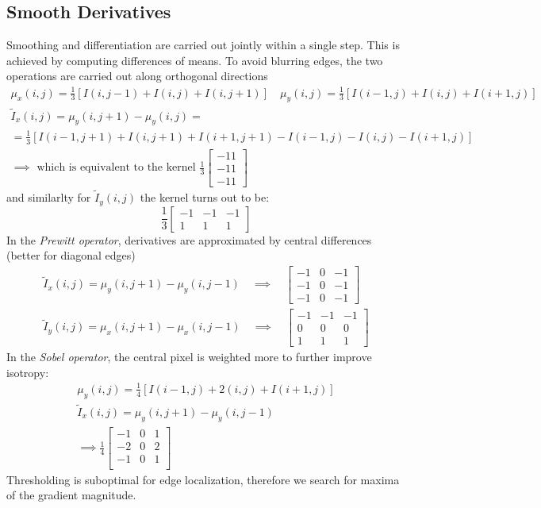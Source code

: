 \documentclass{article}
\begin{document}
\subsection{Smooth Derivatives}
Smoothing and differentiation are carried out jointly within a single step. This is achieved  by computing differences of means. To avoid blurring edges, the two operations are carried out along orthogonal directions
\begin{gather*}
    \mu_x(i,j)=\displaystyle\frac{1}{3}[I(i,j-1)+I(i,j)+I(i,j+1)] \quad \mu_y(i,j)=\displaystyle\frac{1}{3}[I(i-1,j)+I(i,j)+I(i+1,j)]\\
    \tilde{I}_x(i,j) = \mu_y(i,j+1)-\mu_y(i,j) =\\= \displaystyle\frac{1}{3}[I(i-1,j+1)+I(i,j+1)+I(i+1,j+1)-I(i-1,j)-I(i,j)-I(i+1,j)]\\
    \implies \text{ which is equivalent to the kernel }\displaystyle\frac{1}{3}\begin{bmatrix}
        -1 1 \\
        -1 1 \\
        -1 1 
    \end{bmatrix}
\end{gather*}
and similarlty for $\tilde{I}_y(i,j)$ the kernel turns out to be:
\[
    \displaystyle\frac{1}{3}\begin{bmatrix}
        -1 & -1 & -1 \\
        1 & 1 & 1
    \end{bmatrix}
\]
In the \emph{Prewitt operator}, derivatives are approximated by central differences (better for diagonal edges)
\begin{gather*}
    \tilde{I}_x(i,j)=\mu_y(i,j+1)-\mu_y(i,j-1) \quad \implies \quad \begin{bmatrix}
        -1 & 0 & -1 \\
        -1 & 0 & -1 \\
        -1 & 0 & -1 
    \end{bmatrix}\\
    \tilde{I}_y(i,j)=\mu_x(i,j+1)-\mu_x(i,j-1) \quad \implies \quad \begin{bmatrix}
        -1 & -1 & -1 \\
        0 & 0 & 0 \\
        1 & 1 & 1 
    \end{bmatrix}
\end{gather*}
In the \emph{Sobel operator}, the central pixel is weighted more to further improve isotropy:
\begin{gather*}
    \mu_y(i,j)=\displaystyle\frac{1}{4}[I(i-1,j)+2(i,j)+I(i+1,j)]\\
    \tilde{I}_x(i,j)= \mu_y(i,j+1)-\mu_y(i,j-1)\\
    \implies \displaystyle\frac{1}{4}\begin{bmatrix}
        -1 & 0 & 1 \\
        -2 & 0 & 2 \\
        -1 & 0 & 1 \\
    \end{bmatrix}
\end{gather*}
Thresholding is suboptimal for edge localization, therefore we search for maxima of the gradient magnitude. 
\end{document}
